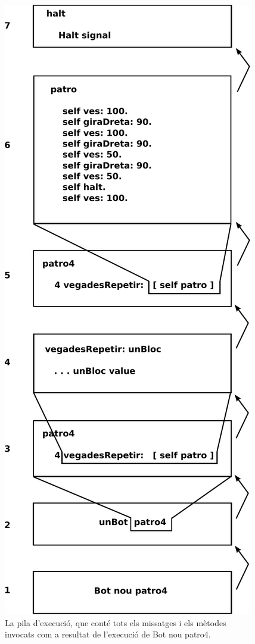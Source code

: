 \begin{figure}
\begin{center}
\includegraphics[scale=0.5]{Imatges/figura15-2.pdf}
\end{center}
\caption{La pila d'execució, que conté tots els missatges i els mètodes invocats com a resultat de l'execució de \textsf{\upshape Bot nou patro4}.}
\label{fig1502}
\end{figure}

